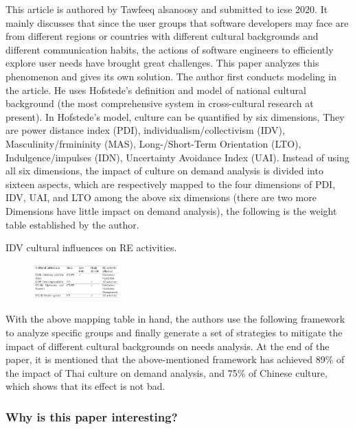 \documentclass[UTF8]{IEEEtran}
\begin{document}
This article\cite{alsanoosy2020identification} is authored by Tawfeeq alsanoosy and submitted to icse 2020. It mainly discusses that since the user groups that software developers may face are from different regions or countries with different cultural backgrounds and different communication habits, the actions of software engineers to efficiently explore user needs have brought great challenges. This paper analyzes this phenomenon and gives its own solution.
The author first conducts modeling in the article. 
He uses Hofstede's definition and model of national cultural background (the most comprehensive system in cross-cultural research at present). In Hofstede's model, culture can be quantified by six dimensions, They are power distance index (PDI), individualism/collectivism (IDV), Masculinity/frmininity (MAS), Long-/Short-Term Orientation (LTO), Indulgence/impulses (IDN), Uncertainty Avoidance Index (UAI). Instead of using all six dimensions, the impact of culture on demand analysis is divided into sixteen aspects, which are respectively mapped to the four dimensions of PDI, IDV, UAI, and LTO among the above six dimensions (there are two more Dimensions have little impact on demand analysis), the following is the weight table established by the author.

\begin{table}[h]
\centering
\caption{\label{tab:widgets}IDV cultural influences on RE activities.}
\end{table}
\begin{figure}[h]
    \centering
    \includegraphics[width=0.3\textwidth]{./img/identable.png}\\
\end{figure}
With the above mapping table in hand, the authors use the following framework to analyze specific groups and finally generate a set of strategies to mitigate the impact of different cultural backgrounds on needs analysis. At the end of the paper, it is mentioned that the above-mentioned framework has achieved 89\% of the impact of Thai culture on demand analysis, and 75\% of Chinese culture, which shows that its effect is not bad.

\subsubsection{Why is this paper interesting?}
\end{document}
